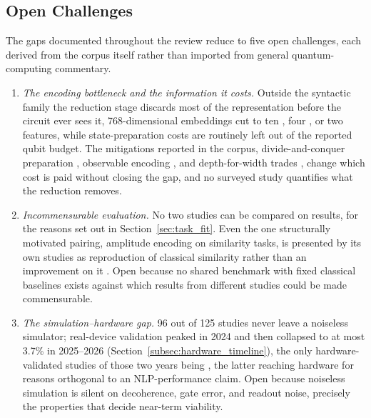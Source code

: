 \documentclass{ieeeaccess}
\begin{document}
\subsection{Open Challenges}
\label{subsec:open_challenges}

The gaps documented throughout the review reduce to five open challenges, each derived from the corpus itself rather than imported from general quantum-computing commentary.

\begin{enumerate}
\item[C1)] \emph{The encoding bottleneck and the information it costs.} Outside the syntactic family the reduction stage discards most of the representation before the circuit ever sees it, 768-dimensional embeddings cut to ten \cite{ahmad_hybrid_2023}, four \cite{kumar_hybrid_2026}, or two \cite{altintas_beyond_2025} features, while state-preparation costs are routinely left out of the reported qubit budget. The mitigations reported in the corpus, divide-and-conquer preparation \cite{zhang_entangled_2024}, observable encoding \cite{tiblias_efficient_2026}, and depth-for-width trades \cite{silver_lexiql_2024}, change which cost is paid without closing the gap, and no surveyed study quantifies what the reduction removes.

\item[C2)] \emph{Incommensurable evaluation.} No two studies can be compared on results, for the reasons set out in Section~\ref{sec:task_fit}. Even the one structurally motivated pairing, amplitude encoding on similarity tasks, is presented by its own studies as reproduction of classical similarity rather than an improvement on it \cite{cavar_word_2025,cavar_old_2026}. Open because no shared benchmark with fixed classical baselines exists against which results from different studies could be made commensurable.

\item[C3)] \emph{The simulation--hardware gap.} 96 out of 125 studies never leave a noiseless simulator; real-device validation peaked in 2024 and then collapsed to at most 3.7\% in 2025--2026 (Section~\ref{subsec:hardware_timeline}), the only hardware-validated studies of those two years being \cite{baik_neural_2025,liu_experimentally_2026}, the latter reaching hardware for reasons orthogonal to an NLP-performance claim. Open because noiseless simulation is silent on decoherence, gate error, and readout noise, precisely the properties that decide near-term viability.


\end{enumerate}
\end{document}
